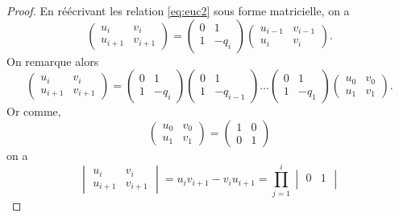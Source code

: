 \documentclass{article}
\theoremstyle{definition}
\theoremstyle{remark}
\begin{document}
\begin{proof}
    En réécrivant les relation \ref{eq:euc2} sous forme matricielle, on a
    \[
    \begin{pmatrix}
        u_{i} & v_{i} \\
        u_{i+1} & v_{i+1}
    \end{pmatrix}
    =
    \begin{pmatrix}
        0 & 1 \\
        1 & -q_{i}
    \end{pmatrix}
    \begin{pmatrix}
        u_{i-1} & v_{i-1} \\
        u_{i} & v_{i}
    \end{pmatrix}.
    \]
    On remarque alors
    \[
    \begin{pmatrix}
        u_{i} & v_{i} \\
        u_{i+1} & v_{i+1}
    \end{pmatrix}
    = 
    \begin{pmatrix}
        0 & 1 \\
        1 & -q_{i}
    \end{pmatrix}
    \begin{pmatrix}
        0 & 1 \\
        1 & -q_{i-1}
    \end{pmatrix}
    \dots
    \begin{pmatrix}
        0 & 1 \\
        1 & -q_{1}
    \end{pmatrix}
    \begin{pmatrix}
        u_0 & v_0 \\
        u_1 & v_1
    \end{pmatrix}.
    \]
    Or comme,
    \[
    \begin{pmatrix}
        u_0 & v_0 \\
        u_1 & v_1
    \end{pmatrix}
    = 
    \begin{pmatrix}
        1 & 0 \\
        0 & 1
    \end{pmatrix}
    \]
    on a
    \[
    \begin{vmatrix}
        u_{i} & v_{i} \\
        u_{i+1} & v_{i+1}
    \end{vmatrix}
    = u_{i}v_{i+1} - v_{i}u_{i+1} = 
    \prod_{j=1}^i
    \begin{vmatrix}
         0 & 1 \\

\end{vmatrix}\]
\end{proof}
\end{document}
